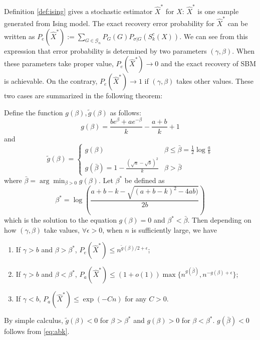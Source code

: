 \documentclass[entropy,article,submit,moreauthors,pdftex]{Definitions/mdpi}
\newcommand{\cG}{\mathcal{G}}
\newcommand{\1}{\mathbbm{1}}
\begin{document}
Definition \ref{def:ising} gives a stochastic estimator $\hat{X}^*$ for $X$: $\hat{X}^*$ is one sample generated from Ising model. The exact recovery error probability for $\hat{X}^*$ can be written as $P_e(\hat{X}^*) := \sum_{G \in \cG_n} P_G(G) P_{\sigma | G}(S^c_k(X))$. We can see from this expression that error probability is determined
by two parameters $(\gamma, \beta)$. When these parameters take proper value, $ P_e(\hat{X}^*)\to 0$ and the exact recovery of SBM is achievable. On the contrary, $P_e(\hat{X}^*) \to 1$ if $(\gamma, \beta)$ takes other values.
These two cases are summarized in the following theorem:
\begin{Theorem}\label{thm:phase_transition}
Define the function $g(\beta), \tilde{g}(\beta)$ as follows:
\begin{equation}
g(\beta) = \frac{be^{\beta} + a e^{-\beta}}{k} - \frac{a+b}{k} +1
\end{equation}
and
\begin{equation}
\tilde{g}(\beta) = \begin{cases}
g(\beta) & \beta \leq \bar{\beta} = \frac{1}{2}\log \frac{a}{b} \\
g(\bar{\beta}) = 1 - \frac{(\sqrt{a} - \sqrt{b})^2}{k} & \beta > \bar{\beta}
\end{cases}
\end{equation}
where $\bar{\beta} =  \arg\min_{\beta > 0} g(\beta)$.
Let $\beta^*$ be defined as
\begin{equation}\label{eq:beta_star}
\beta^* = \log\left(\frac{a + b - k - \sqrt{(a + b - k)^2 - 4 a b)}}{2  b}\right)
\end{equation}
which is the solution to the equation $g(\beta) = 0$ and $\beta^* < \bar{\beta}$. Then depending on
how $(\gamma, \beta)$ take values, $\forall \epsilon > 0$, when $n$ is sufficiently large, we have
\begin{enumerate}
\item If $\gamma > b$ and $\beta > \beta^*$,  $P_e(\hat{X}^*) \leq n^{\tilde{g}(\beta)/2 + \epsilon}$;
\item If $\gamma > b$ and $\beta < \beta^*$, $P_a(\hat{X}^*) \leq (1+o(1))\max\{n^{g(\bar{\beta})}, n^{-g(\beta) + \epsilon}\}$;
\item If $\gamma < b$, $P_a(\hat{X}^*) \leq \exp(-C n)$ for any $C>0$.
\end{enumerate}
\end{Theorem}
By simple calculus, $\tilde{g}(\beta) < 0$ for $\beta> \beta^*$ and $g(\beta)>0$ for $\beta < \beta^*$. $g(\bar{\beta}) < 0$ follows from \eqref{eq:abk}.
\end{document}
